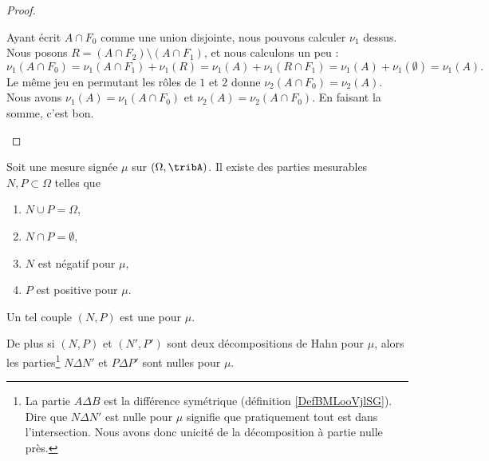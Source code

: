 \begin{proof}
\begin{subproof}
		Ayant écrit \( A\cap F_0\) comme une union disjointe, nous pouvons calculer \( \nu_1\) dessus. Nous posons \( R= (A\cap F_2)\setminus (A\cap F_1) \), et nous calculons un peu :
		\begin{equation}
			\nu_1(A\cap F_0)=\nu_1(A\cap F_1)+\nu_1(R)=\nu_1(A)+\nu_1(R\cap F_1)=\nu_1(A)+\nu_1(\emptyset)=\nu_1(A).
		\end{equation}
		Le même jeu en permutant les rôles de \( 1\) et \( 2\) donne \( \nu_2(A\cap F_0)=\nu_2(A)\).
		\spitem[Conclusion]
		Nous avons \( \nu_1(A)=\nu_1(A\cap F_0)\) et \( \nu_2(A)=\nu_2(A\cap F_0)\). En faisant la somme, c'est bon.
	\end{subproof}
\end{proof}

\begin{propositionDef}		\label{PROPooIBLHooTMfEJW}
	Soit une mesure signée \( \mu\) sur \( (\Omega,\tribA)\). Il existe des parties mesurables \( N,P\subset \Omega\) telles que
	\begin{enumerate}
		\item
		      \( N\cup P=\Omega\),
		\item
		      \( N\cap P=\emptyset\),
		\item
		      \( N\) est négatif pour \( \mu\),
		\item
		      \( P\) est positive pour \( \mu\).
	\end{enumerate}

	Un tel couple \( (N,P)\) est une  pour \( \mu\).

	De plus si \( (N,P)\) et \( (N',P')\) sont deux décompositions de Hahn pour \( \mu\), alors les parties\footnote{La partie \( A\Delta B\) est la différence symétrique (définition \ref{DefBMLooVjlSG}). Dire que \( N\Delta N'\) est nulle pour \( \mu\) signifie que pratiquement tout est dans l'intersection. Nous avons donc unicité de la décomposition à partie nulle près.} \( N\Delta N'\) et \( P\Delta P'\) sont nulles pour \( \mu\).
\end{propositionDef}

